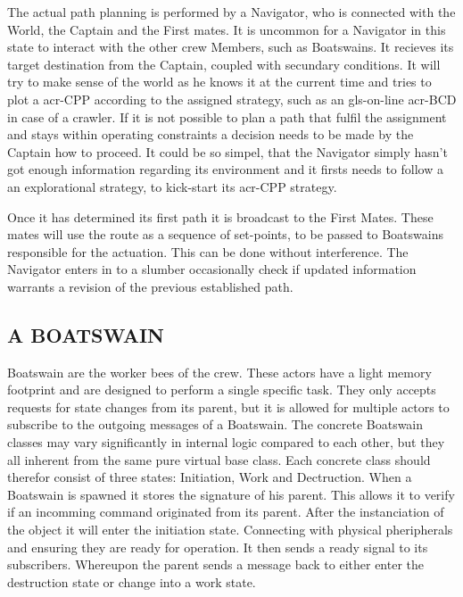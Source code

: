 The actual path planning is performed by a Navigator, who is connected with the World, the Captain and the First mates.
It is uncommon for a Navigator in this state to interact with the other crew Members, such as Boatswains. It recieves
its target destination from the Captain, coupled with secundary conditions. It will try to make sense of the world as he
knows it at the current time and tries to plot a \gls{acr-CPP} according to the assigned strategy, such as an
\gls{gls-on-line} \gls{acr-BCD} in case of a crawler. If it is not possible to plan a path that fulfil the assignment
and stays within operating constraints a decision needs to be made by the Captain how to proceed. It could be so simpel,
that the Navigator simply hasn't got enough information regarding its environment and it firsts needs to follow a an
explorational strategy, to kick-start its \gls{acr-CPP} strategy.

Once it has determined its first path it is broadcast to the First Mates. These mates will use the route as a sequence
of set-points, to be passed to Boatswains responsible for the actuation. This can be done without interference. The
Navigator enters in to a slumber occasionally check if updated information warrants a revision of the previous
established path.

\subsection{A BOATSWAIN}\label{seq:a boatswain}

Boatswain are the worker bees of the crew. These actors have a light memory footprint and are designed to perform a
single specific task. They only accepts requests for state changes from its parent, but it is allowed for multiple
actors to subscribe to the outgoing messages of a Boatswain. The concrete Boatswain classes may vary significantly in
internal logic compared to each other, but they all inherent from the same pure virtual base class. Each concrete class
should therefor consist of three states: Initiation, Work and Dectruction. When a Boatswain is spawned it stores the
signature of his parent. This allows it to verify if an incomming command originated from its parent. After the
instanciation of the object it will enter the initiation state. Connecting with physical pheripherals and ensuring they
are ready for operation. It then sends a ready signal to its subscribers. Whereupon the parent sends a message back to
either enter the destruction state or change into a work state.

